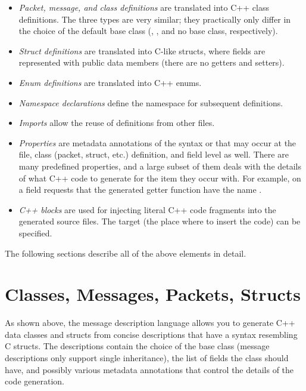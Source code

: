 \begin{itemize}
  \item \textit{Packet, message, and class definitions} are translated into C++ class
    definitions. The three types are very similar; they practically only differ
    in the choice of the default base class (,
    , and no base class, respectively).
  \item \textit{Struct definitions} are translated into C-like structs, where fields
    are represented with public data members (there are no getters and setters).
  \item \textit{Enum definitions} are translated into C++ enums.
  \item \textit{Namespace declarations} define the namespace for subsequent definitions.
  \item \textit{Imports} allow the reuse of definitions from other  files.
  \item \textit{Properties} are metadata annotations of the syntax 
    or  that may occur at the file, class (packet, struct, etc.)
    definition, and field level as well. There are many predefined properties,
    and a large subset of them deals with the details of what C++ code to
    generate for the item they occur with. For example, 
    on a field requests that the generated getter function have the name .
  \item \textit{C++ blocks} are used for injecting literal C++ code fragments
    into the generated source files. The target (the place where to insert the
    code) can be specified.
\end{itemize}

The following sections describe all of the above elements in detail.


\section{Classes, Messages, Packets, Structs}
\label{sec:msg-defs:classes-messages-packets-structs}

As shown above, the message description language allows you to generate C++ data
classes and structs from concise descriptions that have a syntax resembling C
structs. The descriptions contain the choice of the base class (message
descriptions only support single inheritance), the list of fields the class
should have, and possibly various metadata annotations that control
the details of the code generation.

